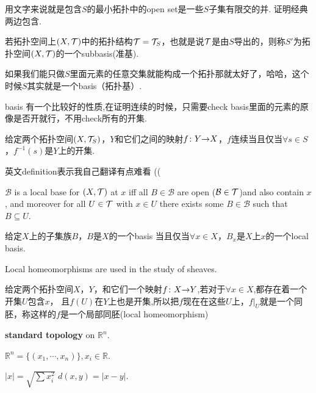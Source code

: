 用文字来说就是包含$S$的最小拓扑中的open set是一些$S$子集有限交的并. 证明经典两边包含.

\begin{definition}
若拓扑空间上$(X,\mathcal{T})$中的拓扑结构$\mathcal{T} = \mathcal{T}_S$，也就是说$\mathcal{T}$是由$S$导出的，则称$S'$为拓扑空间$(X,\mathcal{T})$的一个\rm subbasis(准基).
\end{definition}

如果我们能只做$S$里面元素的任意交集就能构成一个拓扑那就太好了，哈哈，这个时候$S$其实就是一个basis（拓扑基）.

basis 有一个比较好的性质,在证明连续的时候，只需要check basis里面的元素的原像是否开就行，不用check所有的开集.

\begin{proposition}
给定两个拓扑空间$(X,\mathcal{T}_S)$，$Y$和它们之间的映射${f}\colon{Y}{\to}{X}$，$f$连续当且仅当$\forall s \in S$，$f^{-1}(s)$是$Y$上的开集.
\end{proposition}

英文definition表示我自己翻译有点难看 ((

\begin{definition}
\rm $\mathcal{B}$ is a local base for $(X,\mathcal{T})$ at $x$ iff all $B \in \mathcal{B}$ are open ($\mathcal{B} \in \mathcal{T}$)and also contain $x$, and moreover for all $U \in \mathcal{T}$ with $x \in U$ there exists some $B \in \mathcal{B}$ such that $B \subseteq U$.
\end{definition}


\begin{proposition}
给定$X$上的子集族$B$，$B$是$X$的一个basis 当且仅当$\forall x \in X$，$B_x$是$X$上$x$的一个local basis.
\end{proposition}

Local homeomorphisms are used in the study of sheaves.

\begin{definition}
\rm 给定两个拓扑空间$X$，$Y$，和它们一个映射${f}\colon{X}{\to}{Y}$,若对于$\forall x \in X$,都存在着一个开集$U$包含$x$， 且$f(U)$在$Y$上也是开集,所以把$f$现在在这些$U$上，$f|_U$就是一个同胚，称这样的$f$是一个局部同胚(local homeomorphism)
\end{definition}

\textbf{standard topology} on $\mathbb{R}^n$.
\begin{definition}
$\mathbb{R}^n = \{(x_1,\cdots,x_n)\},x_i \in \mathbb{R}$.
\end{definition}

\begin{definition}
$|x| = \sqrt{\sum x_i^2}$ $d(x,y)=|x-y|.$
\end{definition}

